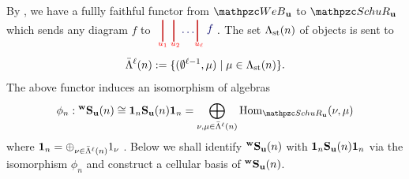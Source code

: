 By \cite[Theorem~ 5.17]{SSW25}, we have a fullly faithful functor from $\qW_\bfu$ to $\qSchu$ which sends any diagram $f$ to 
 $\begin{tikzpicture}[baseline = 10pt, scale=0.5, color=\clr]
\draw[-,line width =1pt,color=\cred] (-4.2,.2) to (-4.2,1.6);
\draw (-4.2,0) node{$\scriptstyle \red{u_1}$};    
\draw[-,line width =1pt,color=\cred] (-3.5,.2) to (-3.5,1.6);
\draw (-3.4,0) node{$\scriptstyle \red{u_2}$};
\draw(-2.6,.8) node{$\ldots$};
\draw[-,line width =1pt,color=\cred] (-2,.2) to (-2,1.6);
\draw (-1.9,0) node{$\scriptstyle \red{u_{\ell}}$};
\draw (-1.2,1) node{$f$};
\end{tikzpicture}.
$
The set $\Lambda_{\text{st}}(n)$ of objects is sent to 
\[
\bar\Lambda^\ell(n):=\{ (\emptyset^{\ell-1}, \mu)\mid \mu\in \Lambda_{\text{st}}(n)\}.
\]
The above functor induces an isomorphism of algebras 
\[
\phi_n: \wS_\bfu(n) \cong  {\bf1}_n \bfS_\bfu(n){\bf1}_n = \bigoplus_{\nu,\mu\in \bar \Lambda^\ell(n)} \Hom_{\qSchu}(\nu,\mu)  \] 
where  ${\bf1}_n=\oplus_{\nu\in \bar\Lambda^{\ell}(n)}1_\nu$ .
Below we shall identify ${}^{\bold{w}}\bold{S}_{\mathbf{u}}(n)$ with ${\bf1}_n \mathbf{S}_{\mathbf{u}}(n){\bf1}_n$ via the isomorphism $\phi_n$ and construct a cellular basis of ${}^{\bold{w}}\bold{S}_{\mathbf{u}}(n)$. 

